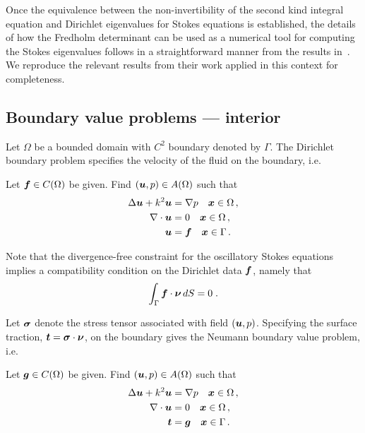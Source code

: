 Once the equivalence between the non-invertibility
of the second kind integral equation and Dirichlet eigenvalues
for Stokes equations is established,
the details of how the Fredholm determinant can be used as a
numerical tool for computing the Stokes eigenvalues
follows in a straightforward manner from the results 
in~\cite{zhao2015robust}. 
We reproduce the relevant results from their work applied 
in this context for completeness.


\subsection{Boundary value problems --- interior}

Let $\Omega$ be a bounded domain with $C^2$ boundary
denoted by $\Gamma$.
The Dirichlet boundary problem specifies the
velocity of the fluid on the boundary, i.e.

\begin{definition}
  Let ${\boldsymbol f} \in C(\Omega)$ be given. Find $({\boldsymbol u},p) \in A(\Omega)$
  such that
  \begin{equation}
  \begin{aligned} \label{eq:dir_interior}
    \Delta {\boldsymbol u} + k^{2} {\boldsymbol u} &= \nabla p \quad {\boldsymbol x} \in \Omega \, ,\\
    \nabla \cdot {\boldsymbol u} &= 0 \quad {\boldsymbol x} \in \Omega \, ,  \\
    {\boldsymbol u} &= {\boldsymbol f} \quad {\boldsymbol x} \in \Gamma \, .
  \end{aligned}
  \end{equation}
\end{definition}
Note that the divergence-free constraint for the oscillatory
Stokes equations implies a compatibility condition on the
Dirichlet data ${\boldsymbol f}$, namely that
\begin{equation} \label{eq:dir_compat}
  \int_\Gamma {\boldsymbol f} \cdot {\boldsymbol \nu} \, dS = 0 \; .
\end{equation}


Let ${\boldsymbol \sigma}$ denote the stress tensor associated with
field $({\boldsymbol u},p)$. 
Specifying the surface traction, ${\boldsymbol t} = {\boldsymbol \sigma} \cdot {\boldsymbol \nu}$,
on the boundary gives the Neumann boundary value
problem, i.e.

\begin{definition}
  Let ${\boldsymbol g} \in C(\Omega)$ be given. Find $({\boldsymbol u},p) \in A(\Omega)$
  such that
  \begin{equation}
  \begin{aligned} \label{eq:neu_interior}
    \Delta {\boldsymbol u} + k^{2} {\boldsymbol u} &= \nabla p \quad {\boldsymbol x} \in \Omega \, ,\\
    \nabla \cdot {\boldsymbol u} &= 0 \quad {\boldsymbol x} \in \Omega \, ,  \\
    {\boldsymbol t} &= {\boldsymbol g} \quad {\boldsymbol x} \in \Gamma \, .
  \end{aligned}
  \end{equation}
\end{definition}

